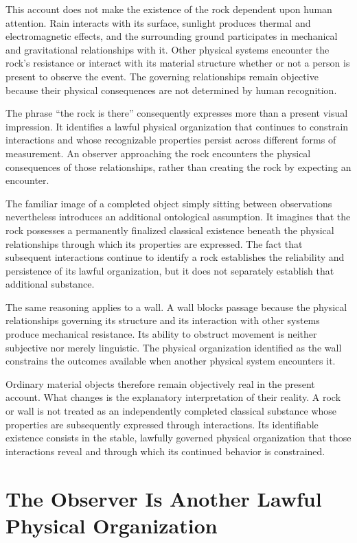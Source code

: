 \documentclass[12pt,onecolumn]{article}
\begin{document}
This account does not make the existence of the rock dependent upon human attention. Rain interacts with its surface, sunlight produces thermal and electromagnetic effects, and the surrounding ground participates in mechanical and gravitational relationships with it. Other physical systems encounter the rock's resistance or interact with its material structure whether or not a person is present to observe the event. The governing relationships remain objective because their physical consequences are not determined by human recognition.

The phrase ``the rock is there'' consequently expresses more than a present visual impression. It identifies a lawful physical organization that continues to constrain interactions and whose recognizable properties persist across different forms of measurement. An observer approaching the rock encounters the physical consequences of those relationships, rather than creating the rock by expecting an encounter.

The familiar image of a completed object simply sitting between observations nevertheless introduces an additional ontological assumption. It imagines that the rock possesses a permanently finalized classical existence beneath the physical relationships through which its properties are expressed. The fact that subsequent interactions continue to identify a rock establishes the reliability and persistence of its lawful organization, but it does not separately establish that additional substance.

The same reasoning applies to a wall. A wall blocks passage because the physical relationships governing its structure and its interaction with other systems produce mechanical resistance. Its ability to obstruct movement is neither subjective nor merely linguistic. The physical organization identified as the wall constrains the outcomes available when another physical system encounters it.

Ordinary material objects therefore remain objectively real in the present account. What changes is the explanatory interpretation of their reality. A rock or wall is not treated as an independently completed classical substance whose properties are subsequently expressed through interactions. Its identifiable existence consists in the stable, lawfully governed physical organization that those interactions reveal and through which its continued behavior is constrained.

\section{The Observer Is Another Lawful Physical Organization}
\end{document}

